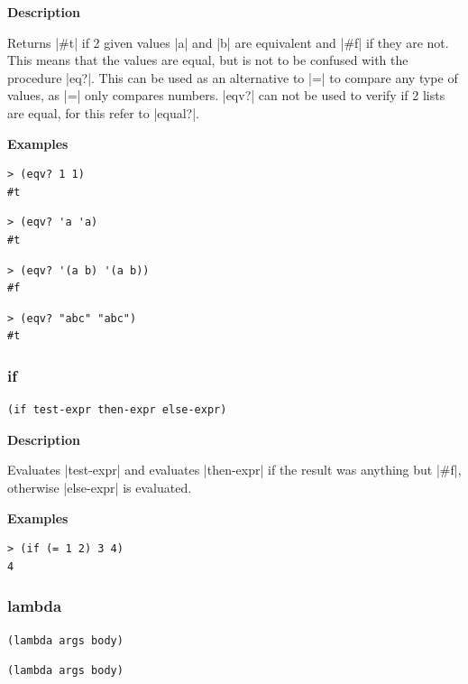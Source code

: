 \documentclass[a4paper]{article}
\begin{document}
\textbf{Description}

Returns |#t| if 2 given values |a| and |b| are equivalent and |#f| if they are not. This means that the values are equal, but is not to be confused with the procedure |eq?|. This can be used as an alternative to |=| to compare any type of values, as |=| only compares numbers. |eqv?| can not be used to verify if 2 lists are equal, for this refer to |equal?|.

\textbf{Examples}

\begin{lstlisting}
> (eqv? 1 1)
#t
\end{lstlisting}

\begin{lstlisting}
> (eqv? 'a 'a)
#t
\end{lstlisting}

\begin{lstlisting}
> (eqv? '(a b) '(a b))
#f
\end{lstlisting}

\begin{lstlisting}
> (eqv? "abc" "abc")
#t
\end{lstlisting}

\subsubsection{if}

\begin{lstlisting}[frame=none]
(if test-expr then-expr else-expr)
\end{lstlisting}

\textbf{Description}

Evaluates |test-expr| and evaluates |then-expr| if the result was anything but |#f|, otherwise |else-expr| is evaluated.

\textbf{Examples}

\begin{lstlisting}
> (if (= 1 2) 3 4)
4
\end{lstlisting}

\subsubsection{lambda}

\begin{lstlisting}[frame=none,belowskip=0pt]
(lambda args body)
\end{lstlisting}
\begin{lstlisting}[frame=none,language=SchemeLambda,aboveskip=0pt]
(lambda args body)
\end{lstlisting}
\end{document}
